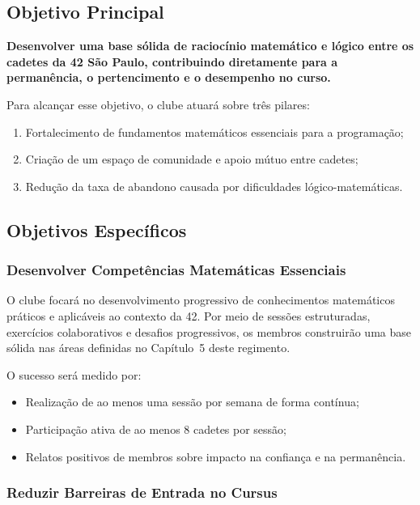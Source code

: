 \documentclass[12pt, a4paper]{article}
\begin{document}
\subsection{Objetivo Principal}

\begin{infobox}
  \textbf{Desenvolver uma base sólida de raciocínio matemático e lógico entre os cadetes
  da 42 São Paulo, contribuindo diretamente para a permanência, o pertencimento e o
  desempenho no curso.}
\end{infobox}

Para alcançar esse objetivo, o clube atuará sobre três pilares:

\begin{enumerate}
  \item Fortalecimento de fundamentos matemáticos essenciais para a programação;
  \item Criação de um espaço de comunidade e apoio mútuo entre cadetes;
  \item Redução da taxa de abandono causada por dificuldades lógico-matemáticas.
\end{enumerate}

\subsection{Objetivos Específicos}

\subsubsection{Desenvolver Competências Matemáticas Essenciais}

O clube focará no desenvolvimento progressivo de conhecimentos matemáticos práticos e
aplicáveis ao contexto da 42. Por meio de sessões estruturadas, exercícios colaborativos e
desafios progressivos, os membros construirão uma base sólida nas áreas definidas no
Capítulo~5 deste regimento.

O sucesso será medido por:

\begin{itemize}
  \item Realização de ao menos uma sessão por semana de forma contínua;
  \item Participação ativa de ao menos 8 cadetes por sessão;
  \item Relatos positivos de membros sobre impacto na confiança e na permanência.
\end{itemize}

\subsubsection{Reduzir Barreiras de Entrada no Cursus}
\end{document}
